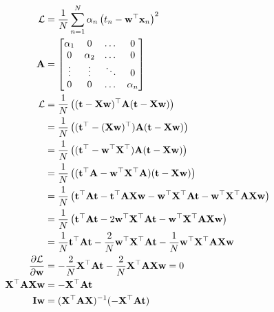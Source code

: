 \documentclass[10pt]{article}
\begin{document}
\begin{itemize}
\begin{eqnarray*}
\begin{aligned}
\mathcal{L} &= {1 \over N} \sum_{n=1}^N \alpha_n \left( t_n - \mathbf{w}^\top \mathbf{x}_n \right)^2
\\
\mathbf{A} &=
	\begin{bmatrix}
	\alpha_{1} & 0 & \dots & 0
	\\
	0 & \alpha_{2} & \dots & 0
	\\
	\vdots & \vdots & \ddots & 0
	\\
	0 & 0 & \dots & \alpha_{n}
	\end{bmatrix}
\\
\mathcal{L} &=  {1 \over N} \left( 
  (\mathbf{t} - \mathbf{X} \mathbf{w})^\top \mathbf{A} (\mathbf{t} - \mathbf{X} \mathbf{w}) 
  \right)
\\
&= {1 \over N} \left(
  (\mathbf{t}^\top - (\mathbf{X} \mathbf{w})^\top) \mathbf{A} (\mathbf{t} - \mathbf{X} \mathbf{w})
  \right)
\\
&= {1 \over N} \left(
  ( \mathbf{t}^\top - \mathbf{w}^\top \mathbf{X}^\top ) \mathbf{A} (\mathbf{t} - \mathbf{X} \mathbf{w})
  \right)
\\
&= {1 \over N} \left(
  ( \mathbf{t}^\top \mathbf{A} - \mathbf{w}^\top \mathbf{X}^\top \mathbf{A}) (\mathbf{t} - \mathbf{X} \mathbf{w})
  \right)
\\
&= {1 \over N} \left(
  \mathbf{t}^\top \mathbf{A} \mathbf{t} 
  - \mathbf{t}^\top \mathbf{A} \mathbf{X} \mathbf{w} 
  - \mathbf{w}^\top \mathbf{X}^\top \mathbf{A} \mathbf{t}
  - \mathbf{w}^\top \mathbf{X}^\top \mathbf{A} \mathbf{X} \mathbf{w}
  \right)
\\
&= {1 \over N} \left(
  \mathbf{t}^\top \mathbf{A} \mathbf{t} 
  - 2 \mathbf{w}^\top \mathbf{X}^\top \mathbf{A} \mathbf{t}
  - \mathbf{w}^\top \mathbf{X}^\top \mathbf{A} \mathbf{X} \mathbf{w}
  \right)
\\
&= {1 \over N} \mathbf{t}^\top \mathbf{A} \mathbf{t} 
  - {2 \over N}  \mathbf{w}^\top \mathbf{X}^\top \mathbf{A} \mathbf{t}
  - {1 \over N} \mathbf{w}^\top \mathbf{X}^\top \mathbf{A} \mathbf{X} \mathbf{w}
\\
\frac { \partial \mathcal{L}} {\partial \mathbf{w}} 
  &= - {2 \over N} \mathbf{X}^\top \mathbf{A} \mathbf{t} 
  - {2 \over N} \mathbf{X}^\top \mathbf{A} \mathbf{X} \mathbf{w} = 0
\\
\mathbf{X}^\top \mathbf{A} \mathbf{X} \mathbf{w}
  &= - \mathbf{X}^\top \mathbf{A} \mathbf{t} 
\\
\mathbf{I} \mathbf{w} &= (\mathbf{X}^\top \mathbf{A} \mathbf{X})^{-1} (- \mathbf{X}^\top \mathbf{A} \mathbf{t})
\end{aligned}
\end{eqnarray*}

\end{itemize}
\end{document}
